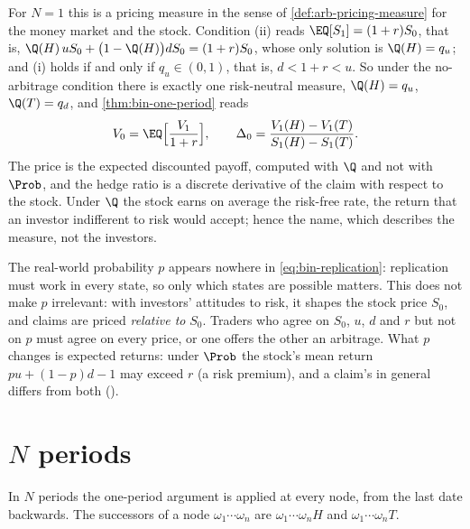 For $N=1$ this is a pricing measure in the sense of \cref{def:arb-pricing-measure} for the
money market and the stock. Condition (ii) reads $\EQ[S_1]=(1+r)S_0$, that is,
$\Q(H)\,uS_0+\big(1-\Q(H)\big)dS_0=(1+r)S_0$, whose only solution is $\Q(H)=q_u$; and (i)
holds if and only if $q_u\in(0,1)$, that is, $d<1+r<u$. So under the no-arbitrage
condition there is exactly one risk-neutral measure, $\Q(H)=q_u$, $\Q(T)=q_d$, and
\cref{thm:bin-one-period} reads
\begin{equation}\label{eq:bin-rn-one}
  V_0=\EQ\Big[\frac{V_1}{1+r}\Big],\qquad \Delta_0=\frac{V_1(H)-V_1(T)}{S_1(H)-S_1(T)} .
\end{equation}
The price is the expected discounted payoff, computed with $\Q$ and not with $\Prob$, and
the hedge ratio is a discrete derivative of the claim with respect to the stock. Under
$\Q$ the stock earns on average the risk-free rate, the return that an investor indifferent
to risk would accept; hence the name, which describes the measure, not the investors.

\begin{remark}\label{rem:bin-p}
The real-world probability $p$ appears nowhere in \eqref{eq:bin-replication}: replication
must work in every state, so only which states are possible matters. This does not make $p$
irrelevant: with investors' attitudes to risk, it shapes the stock price $S_0$, and claims
are priced \emph{relative to} $S_0$. Traders who agree on $S_0$, $u$, $d$ and $r$ but not on
$p$ must agree on every price, or one offers the other an arbitrage. What $p$ changes is
expected returns: under $\Prob$ the stock's mean return $pu+(1-p)d-1$ may exceed $r$ (a
risk premium), and a claim's in general differs from both ().
\end{remark}


\section{\texorpdfstring{$N$}{N} periods}\label{sec:bin-multi-period}

In $N$ periods the one-period argument is applied at every node, from the last date
backwards. The successors of a node $\omega_1\cdots\omega_n$ are $\omega_1\cdots\omega_nH$
and $\omega_1\cdots\omega_nT$.

